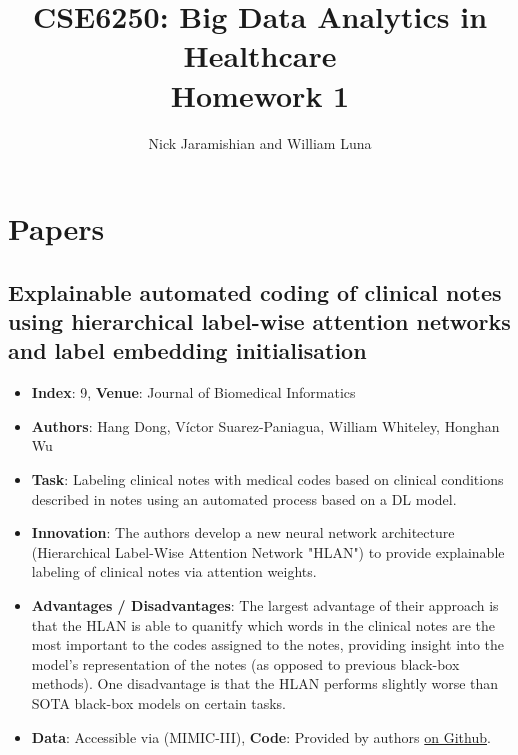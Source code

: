 \documentclass[
	letterpaper, %
]{jdf}
\title{CSE6250: Big Data Analytics in Healthcare \\ Homework 1}
\author{Nick Jaramishian and William Luna}
\begin{document}
\maketitle

\section{Papers}

\subsection{Explainable automated coding of clinical notes using hierarchical label-wise attention networks and label embedding initialisation }
\begin{itemize}[noitemsep,topsep=0pt,parsep=0pt,partopsep=0pt]
\item \textbf{Index}: 9, \textbf{Venue}: Journal of Biomedical Informatics
\item \textbf{Authors}: Hang Dong, Víctor Suarez-Paniagua, William Whiteley, Honghan Wu 
\item \textbf{Task}: Labeling clinical notes with medical codes based on clinical conditions described in notes using an automated process based on a DL model.
\item \textbf{Innovation}: The authors develop a new neural network architecture (Hierarchical Label-Wise Attention Network "HLAN") to provide explainable labeling of clinical notes via attention weights. 
\item \textbf{Advantages / Disadvantages}: The largest advantage of their approach is that the HLAN is able to quanitfy which words in the clinical notes are the most important to the codes assigned to the notes, providing insight into the model's representation of the notes (as opposed to previous black-box methods). One disadvantage is that the HLAN performs slightly worse than SOTA black-box models on certain tasks. 
\item \textbf{Data}: Accessible via (MIMIC-III), \textbf{Code}: Provided by authors \href{https://github.com/acadTags/Explainable-Automated-Medical-Coding}{on Github}.
\end{itemize}
\end{document}
